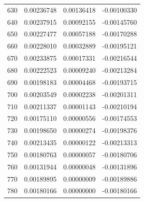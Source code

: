\begin{longtable}{@{}rrrr@{}}
630 & 0.00236748 & 0.00136418 & -0.00100330 \\
640 & 0.00237915 & 0.00092155 & -0.00145760 \\
650 & 0.00227477 & 0.00057188 & -0.00170288 \\
660 & 0.00228010 & 0.00032889 & -0.00195121 \\
670 & 0.00233875 & 0.00017331 & -0.00216544 \\
680 & 0.00222523 & 0.00009240 & -0.00213284 \\
690 & 0.00198183 & 0.00004468 & -0.00193715 \\
700 & 0.00203549 & 0.00002238 & -0.00201311 \\
710 & 0.00211337 & 0.00001143 & -0.00210194 \\
720 & 0.00175110 & 0.00000556 & -0.00174553 \\
730 & 0.00198650 & 0.00000274 & -0.00198376 \\
740 & 0.00213435 & 0.00000122 & -0.00213313 \\
750 & 0.00180763 & 0.00000057 & -0.00180706 \\
760 & 0.00131944 & 0.00000048 & -0.00131896 \\
770 & 0.00189895 & 0.00000009 & -0.00189886 \\
780 & 0.00180166 & 0.00000000 & -0.00180166 \\
\bottomrule\end{longtable}